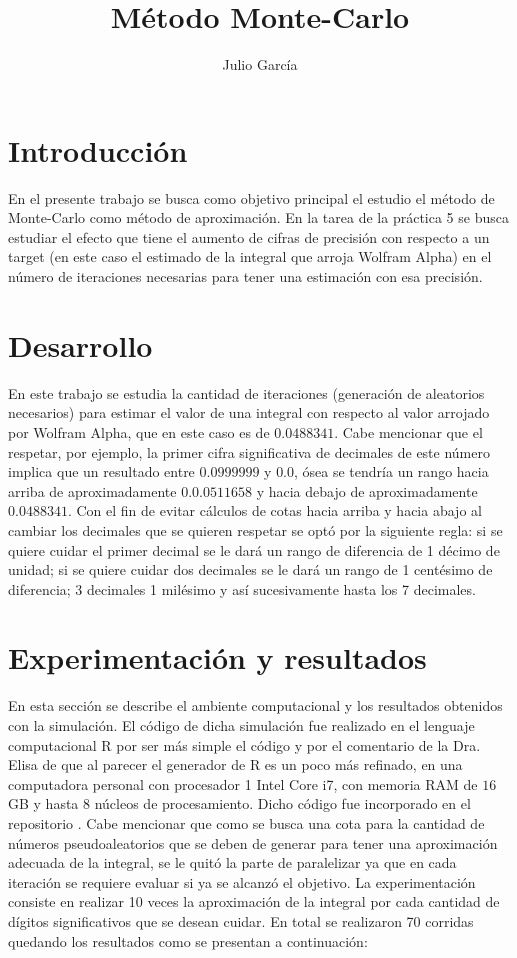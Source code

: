 \documentclass{article}
\title {Método Monte-Carlo}
\author{Julio Garc\'ia}
\begin{document}
	\renewcommand{\listtablename}{Índice de tablas}
	\renewcommand{\tablename}{Cuadro}
\maketitle
	
\section{Introducción}
En el presente trabajo se busca como objetivo principal el estudio el método de Monte-Carlo como método de aproximación.
En la tarea de la práctica 5 \cite{p5} se busca estudiar el efecto que tiene el aumento de cifras de precisión con respecto a un target (en este caso el estimado de la integral que arroja Wolfram Alpha) en el número de iteraciones necesarias para tener una estimación con esa precisión.

\section{Desarrollo}
En este trabajo se estudia la cantidad de iteraciones (generación de aleatorios necesarios) para estimar el valor de una integral con respecto al valor arrojado por Wolfram Alpha, que en este caso es de $0.0488341$. 
Cabe mencionar que el respetar, por ejemplo, la primer cifra significativa de decimales de este número implica que un resultado entre $0.0999999$ y $0.0$, ósea se tendría un rango hacia arriba de aproximadamente $0. 0.0511658$ y hacia debajo de aproximadamente $0.0488341$. Con el fin de evitar cálculos de cotas hacia arriba y hacia abajo al cambiar los decimales que se quieren respetar se optó por la siguiente regla: si se quiere cuidar el primer decimal se le dará un rango de diferencia de 1 décimo de unidad; si se quiere cuidar dos decimales se le dará un rango de 1 centésimo de diferencia; 3 decimales 1 milésimo y así sucesivamente hasta los 7 decimales. 

\section{Experimentación y resultados}
En esta sección se describe el ambiente computacional y los resultados obtenidos con la simulación. El código de dicha simulación fue realizado en el lenguaje computacional R por ser más simple el código y por el comentario de la Dra. Elisa de que al parecer el generador de R es un poco más refinado, en una computadora personal con procesador 1 Intel Core i7, con memoria RAM de $16$ GB y hasta 8 núcleos de procesamiento. Dicho código fue incorporado en el repositorio \cite{p_5}.
Cabe mencionar que como se busca una cota para la cantidad de números pseudoaleatorios que se deben de generar para tener una aproximación adecuada de la integral, se le quitó la parte de paralelizar ya que en cada iteración se requiere evaluar si ya se alcanzó el objetivo.
La experimentación consiste en realizar 10 veces la aproximación de la integral por cada cantidad de dígitos significativos que se desean cuidar. En total se realizaron 70 corridas quedando los resultados como se presentan a continuación:
\end{document}
